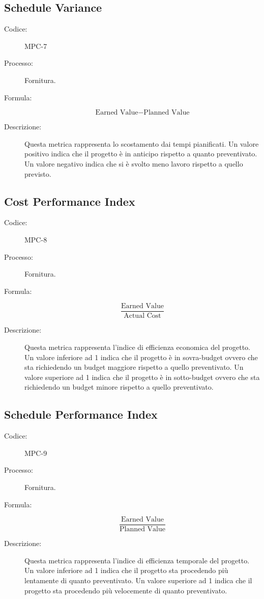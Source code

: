 \subsection{Schedule Variance}
\begin{description}
    \item[Codice:] MPC-7
    \item[Processo:] Fornitura.
    \item[Formula:]
    \begin{equation}
        \text{Earned Value} - \text{Planned Value}
    \end{equation}
    \item[Descrizione:] Questa metrica rappresenta lo scostamento dai tempi pianificati. Un valore positivo indica che il progetto è in anticipo rispetto a quanto preventivato. Un valore negativo indica che si è svolto meno lavoro rispetto a quello previsto.
\end{description}

\subsection{Cost Performance Index}
\begin{description}
    \item[Codice:] MPC-8
    \item[Processo:] Fornitura.
    \item[Formula:]
    \begin{equation}
        \frac{\text{Earned Value}}{\text{Actual Cost}}
    \end{equation}
    \item[Descrizione:] Questa metrica rappresenta l'indice di efficienza economica del progetto. Un valore inferiore ad 1 indica che il progetto è in sovra-budget ovvero che sta richiedendo un budget maggiore rispetto a quello preventivato. Un valore superiore ad 1 indica che il progetto è in sotto-budget ovvero che sta richiedendo un budget minore rispetto a quello preventivato.
\end{description}

\subsection{Schedule Performance Index}
\begin{description}
    \item[Codice:] MPC-9
    \item[Processo:] Fornitura.
    \item[Formula:]
    \begin{equation}
        \frac{\text{Earned Value}}{\text{Planned Value}}
    \end{equation}
    \item[Descrizione:] Questa metrica rappresenta l'indice di efficienza temporale del progetto. Un valore inferiore ad 1 indica che il progetto sta procedendo più lentamente di quanto preventivato. Un valore superiore ad 1 indica che il progetto sta procedendo più velocemente di quanto preventivato.
\end{description}

